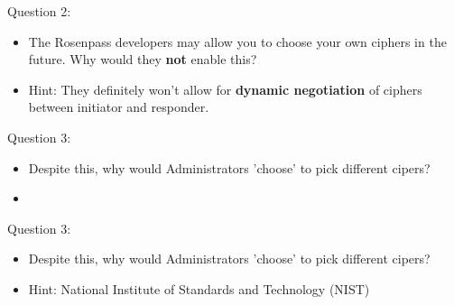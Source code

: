 \documentclass{rosenpass-beamer}
\begin{document}
\begin{frame}{Question 2:}
\begin{itemize}
  \item The Rosenpass developers may allow you to choose your own ciphers in the future.
    Why would they \textbf{not} enable this?
  \item Hint: They definitely won't allow for \textbf{dynamic negotiation} of ciphers between initiator and responder.
\end{itemize}
\end{frame}


\begin{frame}{Question 3:}
\begin{itemize}
  \item Despite this, why would Administrators 'choose' to pick different cipers?
  \item 
\end{itemize}
\end{frame}


\begin{frame}{Question 3:}
\begin{itemize}
  \item Despite this, why would Administrators 'choose' to pick different cipers?
  \item Hint: National Institute of Standards and Technology (NIST)
\end{itemize}
\end{frame}


\setcounter{framenumber}{\totalcontentframes}
\end{document}
